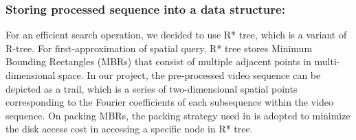 \subsubsection{Storing processed sequence into a data structure:} 
For an efficient search operation, we decided to use R* tree\cite{Beckmann:1990}, which is a variant of R-tree. For first-approximation of spatial query, R* tree stores Minimum Bounding Rectangles (MBRs) that consist of multiple adjacent points in multi-dimensional space. In our project, the pre-processed video sequence can be depicted as a trail, which is a series of two-dimensional spatial points corresponding to the Fourier coefficients of each subsequence within the video sequence. On packing MBRs, the packing strategy used in \cite{Faloutsos:1994}\cite{Kamel:1993} is adopted to minimize the disk access cost in accessing a specific node in R* tree.